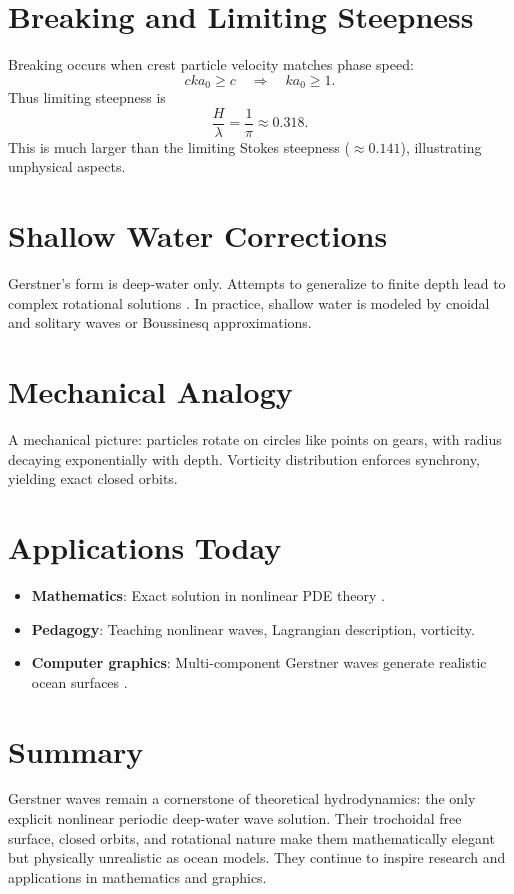 \documentclass[11pt]{article}
\begin{document}
\section{Breaking and Limiting Steepness}
Breaking occurs when crest particle velocity matches phase speed:
\begin{equation}
c k a_0 \geq c \quad \Rightarrow \quad k a_0 \geq 1.
\end{equation}
Thus limiting steepness is
\begin{equation}
\frac{H}{\lambda} = \frac{1}{\pi} \approx 0.318.
\end{equation}
This is much larger than the limiting Stokes steepness ($\approx 0.141$), illustrating unphysical aspects.

\section{Shallow Water Corrections}
Gerstner’s form is deep-water only. Attempts to generalize to finite depth lead to complex rotational solutions \cite{constantin2001gerstner,henry2008}. In practice, shallow water is modeled by cnoidal and solitary waves or Boussinesq approximations.

\section{Mechanical Analogy}
A mechanical picture: particles rotate on circles like points on gears, with radius decaying exponentially with depth. Vorticity distribution enforces synchrony, yielding exact closed orbits.

\section{Applications Today}
\begin{itemize}
\item \textbf{Mathematics}: Exact solution in nonlinear PDE theory \cite{constantin2001gerstner}.
\item \textbf{Pedagogy}: Teaching nonlinear waves, Lagrangian description, vorticity.
\item \textbf{Computer graphics}: Multi-component Gerstner waves generate realistic ocean surfaces \cite{tessendorf2001simulating}.
\end{itemize}

\section{Summary}
Gerstner waves remain a cornerstone of theoretical hydrodynamics: the only explicit nonlinear periodic deep-water wave solution. Their trochoidal free surface, closed orbits, and rotational nature make them mathematically elegant but physically unrealistic as ocean models. They continue to inspire research and applications in mathematics and graphics.
\end{document}
